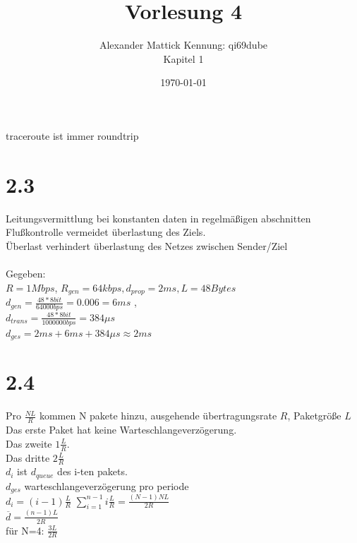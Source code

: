 \documentclass{article}
\author{
Alexander Mattick Kennung: qi69dube\\
Kapitel 1
}
\date{\today}
\title{Vorlesung 4}
\begin{document}
	\maketitle
	traceroute ist immer roundtrip\\
	\section{2.3}
	Leitungsvermittlung bei konstanten daten in regelmäßigen abschnitten\\
	Flußkontrolle vermeidet überlastung des Ziels.\\
	Überlast verhindert überlastung des Netzes zwischen Sender/Ziel\\
	\\
	Gegeben:\\
	$R=1Mbps$, $R_{gen} = 64kbps, d_{prop}=2ms, L=48Bytes$\\
	$d_{gen}=\frac{48*8bit}{64000bps}=0.006=6ms$ ,\\
	$d_{trans}=\frac{48*8bit}{1000 000bps}=384\mu s$\\
	$d_{ges}= 2ms+6ms+384\mu s\approx 2ms$\\
	\section{2.4}
	Pro $\frac{NL}{R}$ kommen N pakete hinzu, ausgehende übertragungsrate $R$, Paketgröße $L$\\
	Das erste Paket hat keine Warteschlangeverzögerung.\\
	Das zweite $1\frac{L}{R}$.\\
	Das dritte $2\frac{L}{R}$\\
	$d_i$ ist $d_{queue}$ des i-ten pakets.\\
	$d_{ges}$ warteschlangeverzögerung pro periode\\
	$d_i = (i-1)\frac{L}{R}$
	$\sum\limits^{n-1}_{i=1} i\frac{L}{R} = \frac{(N-1)NL}{2R}$\\
	$\overline{d} = \frac{(n-1)L}{2R}$\\
	für N=4: $\frac{3L}{2R}$\\
\end{document}
